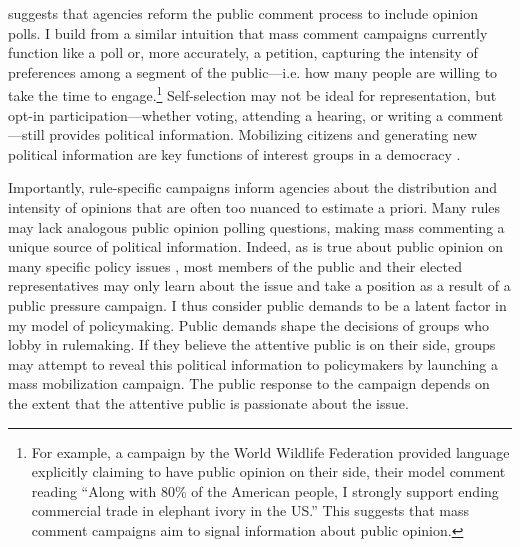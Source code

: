 \citet{Rauch2016} suggests that agencies reform the public comment process to include opinion polls. I build from a similar intuition that mass comment campaigns currently function like a poll or, more accurately, a petition, capturing the intensity of preferences among a segment of the public---i.e. how many people are willing to take the time to engage.\footnote{
For example, a campaign by the World Wildlife Federation provided language explicitly claiming to have public opinion on their side, their model comment reading ``Along with 80\% of the American people, I strongly support ending commercial trade in elephant ivory in the US.'' This suggests that mass comment campaigns aim to signal information about public opinion.
} 
Self-selection may not be ideal for representation, but opt-in participation---whether voting, attending a hearing, or writing a comment---still provides political information. 
Mobilizing citizens and generating new political information are key functions of interest groups in a democracy \citep{Mansbridge1992, Mahoney2007}. %

Importantly, rule-specific campaigns inform agencies about the distribution and intensity of opinions that are often too nuanced to estimate a priori. Many rules may lack analogous public opinion polling questions, making mass commenting a unique source of political information. Indeed, as is true about public opinion on many specific policy issues \citep{Hutchings2003},  most members of the public and their elected representatives may only learn about the issue and take a position as a result of a public pressure campaign. I thus consider public demands to be a latent factor in my model of policymaking. Public demands shape the decisions of groups who lobby in rulemaking. If they believe the attentive public is on their side, groups may attempt to reveal this political information to policymakers by launching a mass mobilization campaign. The public response to the campaign depends on the extent that the attentive public is passionate about the issue.%

